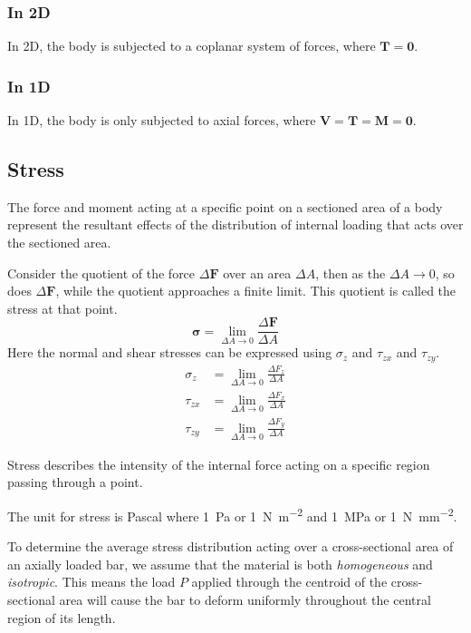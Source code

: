 \documentclass{article}
\begin{document}
\subsubsection{In 2D}
In 2D, the body is subjected to a coplanar system of forces, where \(\symbf{T} = \symbf{0}\).
\subsubsection{In 1D}
In 1D, the body is only subjected to axial forces, where \(\symbf{V} = \symbf{T} = \symbf{M} = \symbf{0}\).
\subsection{Stress}
The force and moment acting at a specific point on a sectioned area of a body represent the resultant effects of
the distribution of internal loading that acts over the sectioned area.
\begin{definition}[Stress]
    Consider the quotient of the force \(\Delta \symbf{F}\) over an area \(\Delta A\), then as the \(\Delta A \to 0\),
    so does \(\Delta \symbf{F}\), while the quotient approaches a finite limit. This quotient is called the stress at
    that point.
    \begin{equation*}
        \symbf{\sigma} = \lim_{\Delta A \to 0} \frac{\Delta \symbf{F}}{\Delta A}
    \end{equation*}
    Here the normal and shear stresses can be expressed using \(\sigma_z\) and \(\tau_{zx}\) and \(\tau_{zy}\).
    \begin{align*}
        \sigma_z  & = \lim_{\Delta A \to 0} \frac{\Delta F_z}{\Delta A} \\
        \tau_{zx} & = \lim_{\Delta A \to 0} \frac{\Delta F_x}{\Delta A} \\
        \tau_{zy} & = \lim_{\Delta A \to 0} \frac{\Delta F_y}{\Delta A}
    \end{align*}

    Stress describes the intensity of the internal force acting on a specific region passing through a point.

    The unit for stress is Pascal where \qty{1}{Pa} or \qty{1}{N.m^{-2}} and \qty{1}{MPa} or \qty{1}{N.mm^{-2}}.
\end{definition}
To determine the average stress distribution acting over a cross-sectional area of an axially loaded bar,
we assume that the material is both \textit{homogeneous} and \textit{isotropic}.
This means the load \(P\) applied through the centroid of the cross-sectional area
will cause the bar to deform uniformly throughout the central region of its length.
\end{document}
